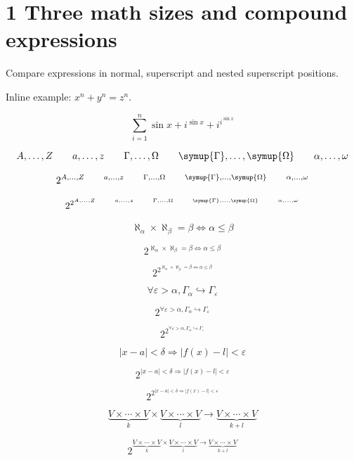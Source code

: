\documentclass[a4paper,10pt]{article}
\begin{document}
\par\medskip

\section*{1 Three math sizes and compound expressions}
Compare expressions in normal, superscript and nested superscript positions.

Inline example: $x^n+y^n=z^n$.

\[
\sum_{i=1}^n \sin x+i^{\sin x}+i^{i^{\sin x}}
\]

\[
A,\ldots,Z\qquad a,\dots,z\qquad \Gamma,\ldots,\Omega\qquad
\symup{\Gamma},\ldots,\symup{\Omega} \qquad\alpha,\ldots,\omega
\]

\[
2^{A,\ldots,Z\qquad a,\dots,z\qquad \Gamma,\ldots,\Omega\qquad
\symup{\Gamma},\ldots,\symup{\Omega} \qquad\alpha,\ldots,\omega}
\]

\[
2^{2^{A,\ldots,Z\qquad a,\dots,z\qquad \Gamma,\ldots,\Omega\qquad
\symup{\Gamma},\ldots,\symup{\Omega} \qquad\alpha,\ldots,\omega}}
\]

\[
\aleph_\alpha\times\aleph_\beta=\beta \iff \alpha\le\beta
\]

\[
2^{\aleph_\alpha\times\aleph_\beta=\beta \iff \alpha\le\beta}
\]

\[
2^{2^{\aleph_\alpha\times\aleph_\beta=\beta \iff \alpha\le\beta}}
\]

\[
\forall \varepsilon>\alpha,
\Gamma_\alpha\hookrightarrow\Gamma_\varepsilon
\]

\[
2^{\forall \varepsilon>\alpha,
\Gamma_\alpha\hookrightarrow\Gamma_\varepsilon}
\]

\[
2^{2^{\forall \varepsilon>\alpha,
\Gamma_\alpha\hookrightarrow\Gamma_\varepsilon}}
\]

\[
|x-a|<\delta\Longrightarrow|f(x)-l|<\varepsilon
\]

\[
2^{|x-a|<\delta\Longrightarrow|f(x)-l|<\varepsilon}
\]

\[
2^{2^{|x-a|<\delta\Longrightarrow|f(x)-l|<\varepsilon}}
\]

\[
\underbrace{V\times\cdots\times V}_k\times\underbrace{V\times\cdots\times
V}_l \to \underbrace{V\times\cdots\times V}_{k+l}
\]

\[
2^{\underbrace{V\times\cdots\times V}_k\times\underbrace{V\times\cdots\times
V}_l \to \underbrace{V\times\cdots\times V}_{k+l}}
\]
\end{document}
